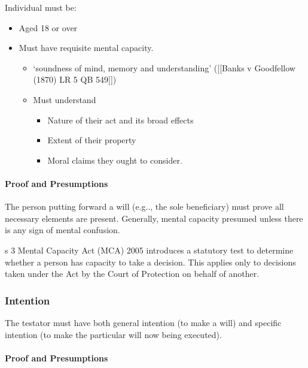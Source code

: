 \documentclass[
]{article}
\providecommand{\tightlist}{%
  \setlength{\itemsep}{0pt}\setlength{\parskip}{0pt}}
\begin{document}
Individual must be:

\begin{itemize}
\tightlist
\item
  Aged 18 or over
\item
  Must have requisite mental capacity.

  \begin{itemize}
  \tightlist
  \item
    `soundness of mind, memory and understanding' ({[}{[}Banks v
    Goodfellow (1870) LR 5 QB 549{]}{]})
  \item
    Must understand

    \begin{itemize}
    \tightlist
    \item
      Nature of their act and its broad effects
    \item
      Extent of their property
    \item
      Moral claims they ought to consider.
    \end{itemize}
  \end{itemize}
\end{itemize}

\hypertarget{proof-and-presumptions}{%
\paragraph{Proof and Presumptions}\label{proof-and-presumptions}}

The person putting forward a will (e.g.., the sole beneficiary) must
prove all necessary elements are present. Generally, mental capacity
presumed unless there is any sign of mental confusion.

s 3 Mental Capacity Act (MCA) 2005 introduces a statutory test to
determine whether a person has capacity to take a decision. This applies
only to decisions taken under the Act by the Court of Protection on
behalf of another.

\hypertarget{intention}{%
\subsubsection{Intention}\label{intention}}

The testator must have both general intention (to make a will) and
specific intention (to make the particular will now being executed).

\hypertarget{proof-and-presumptions-1}{%
\paragraph{Proof and Presumptions}\label{proof-and-presumptions-1}}
\end{document}
